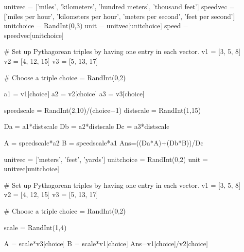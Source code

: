 \begin{sagesilent}
unitvec = ['miles', 'kilometers', 'hundred meters', 'thousand feet']
speedvec = ['miles per hour', 'kilometers per hour', 'meters per second', 'feet per second']
unitchoice = RandInt(0,3)
unit = unitvec[unitchoice]
speed = speedvec[unitchoice]

# Set up Pythagorean triples by having one entry in each vector.
v1 = [3, 5, 8]
v2 = [4, 12, 15]
v3 = [5, 13, 17]

# Choose a triple
choice = RandInt(0,2)

a1 = v1[choice]
a2 = v2[choice]
a3 = v3[choice]

speedscale = RandInt(2,10)/(choice+1)
distscale = RandInt(1,15)

Da = a1*distscale
Db = a2*distscale
Dc = a3*distscale

A = speedscale*a2
B = speedscale*a1
Ans=((Da*A)+(Db*B))/Dc

\end{sagesilent}






\begin{sagesilent}

unitvec = ['meters', 'feet', 'yards']
unitchoice = RandInt(0,2)
unit = unitvec[unitchoice]

# Set up Pythagorean triples by having one entry in each vector.
v1 = [3, 5, 8]
v2 = [4, 12, 15]
v3 = [5, 13, 17]

# Choose a triple
choice = RandInt(0,2)

scale = RandInt(1,4)

A = scale*v3[choice]
B = scale*v1[choice]
Ans=v1[choice]/v2[choice]
\end{sagesilent}

